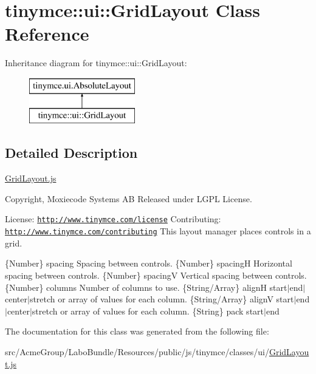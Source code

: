 \hypertarget{classtinymce_1_1ui_1_1_grid_layout}{\section{tinymce\+:\+:ui\+:\+:Grid\+Layout Class Reference}
\label{classtinymce_1_1ui_1_1_grid_layout}
}
Inheritance diagram for tinymce\+:\+:ui\+:\+:Grid\+Layout\+:\begin{figure}[H]
\begin{center}
\leavevmode
\includegraphics[height=2.000000cm]{classtinymce_1_1ui_1_1_grid_layout}
\end{center}
\end{figure}


\subsection{Detailed Description}
\hyperlink{_grid_layout_8js}{Grid\+Layout.\+js}

Copyright, Moxiecode Systems A\+B Released under L\+G\+P\+L License.

License\+: \href{http://www.tinymce.com/license}{\tt http\+://www.\+tinymce.\+com/license} Contributing\+: \href{http://www.tinymce.com/contributing}{\tt http\+://www.\+tinymce.\+com/contributing} This layout manager places controls in a grid.

\{Number\} spacing Spacing between controls.  \{Number\} spacing\+H Horizontal spacing between controls.  \{Number\} spacing\+V Vertical spacing between controls.  \{Number\} columns Number of columns to use.  \{String/\+Array\} align\+H start$\vert$end$\vert$center$\vert$stretch or array of values for each column.  \{String/\+Array\} align\+V start$\vert$end$\vert$center$\vert$stretch or array of values for each column.  \{String\} pack start$\vert$end 

The documentation for this class was generated from the following file\+:\begin{DoxyCompactItemize}
\item 
src/\+Acme\+Group/\+Labo\+Bundle/\+Resources/public/js/tinymce/classes/ui/\hyperlink{_grid_layout_8js}{Grid\+Layout.\+js}\end{DoxyCompactItemize}
